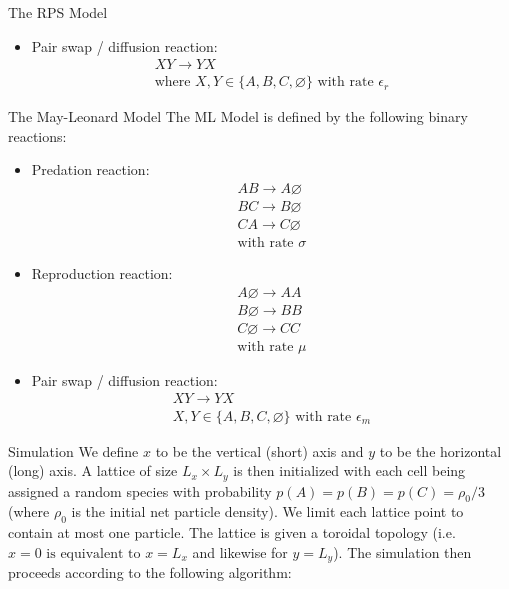 \documentclass{beamer}
\begin{document}
\begin{frame}{}
\begin{textblock}{0.32}
\begin{block}{The RPS Model}
\begin{itemize}
            \item Pair swap / diffusion reaction:
            \begin{gather*}
                XY \rightarrow YX \\
                \text{where }X, Y \in \{A, B, C, \varnothing\} \text{ with rate } \epsilon_r
            \end{gather*}
        \end{itemize}
    \end{block}
    \hfill
    \begin{block}{The May-Leonard Model}
        The ML Model is defined by the following binary reactions:
        \begin{itemize}
            \item Predation reaction:
            \begin{gather*}
                AB \rightarrow A \varnothing \\
                BC \rightarrow B \varnothing \\
                CA \rightarrow C \varnothing \\            
                \text{with rate } \sigma
            \end{gather*}
            \item Reproduction reaction:
            \begin{gather*}
                A \varnothing \rightarrow AA\\
                B \varnothing \rightarrow BB\\
                C \varnothing \rightarrow CC\\            
                \text{with rate } \mu
            \end{gather*}
            \item Pair swap / diffusion reaction:
            \begin{gather*}
                XY \rightarrow YX \\
                X, Y \in \{A, B, C, \varnothing\} \text{ with rate } \epsilon_m
            \end{gather*}
        \end{itemize}

    \end{block}
    \hfill
    \begin{block}{Simulation}
        We define $x$ to be the vertical (short) axis and $y$ to be the horizontal
        (long) axis. A lattice of size $L_x \times L_y$ is then initialized with each cell 
        being assigned a random species with probability $p (A) = p (B) = p (C) = {\rho_0}/{3}$ (where $\rho_0$ is the 
        initial net particle density). We limit each lattice point to contain at most
        one particle.
        The lattice is given a toroidal topology (i.e. $x=0 \text{ is equivalent 
        to } x = L_x$ and likewise for $y = L_y$). The simulation then proceeds according 
        to the following algorithm:


\end{block}
\end{textblock}
\end{frame}
\end{document}

